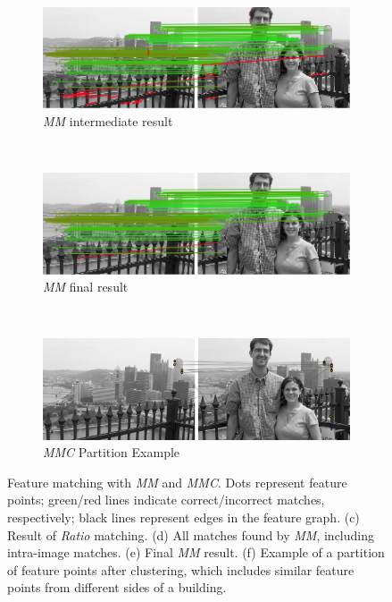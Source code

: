 \begin{figure}[h]
\begin{subfigure}[t]{0.5\columnwidth}
			\includegraphics[width=0.95\columnwidth]{images/mirror_match_with_pruned}
			\caption{\emph{MM} intermediate result}
			\label{fig:within}
		\end{subfigure}%
		\\ %
		\begin{subfigure}[t]{0.5\columnwidth}
			\centering
			\includegraphics[width=0.95\columnwidth]{images/mirror_match}
			\caption{\emph{MM} final result}
			\label{fig:without}
		\end{subfigure}%
		~ %
		\begin{subfigure}[t]{0.5\columnwidth}
			\centering
			\includegraphics[width=0.95\columnwidth]{images/MMC_partition}
			\caption{\emph{MMC} Partition Example}
			\label{fig:pitts_partition}
		\end{subfigure}%
	\caption{Feature matching with \emph{MM} and \emph{MMC}. Dots represent feature points; green/red lines indicate correct/incorrect matches, respectively; black lines represent edges in the feature graph.  
	(c) Result of \emph{Ratio} matching. 
  (d) All matches found by \emph{MM}, including intra-image matches. 
	(e) Final \emph{MM} result. 
    (f) Example of a partition of feature points after clustering, which 
includes similar feature points from different sides of a building.}%
	\label{fig:comparemirror}%
\end{figure}%

